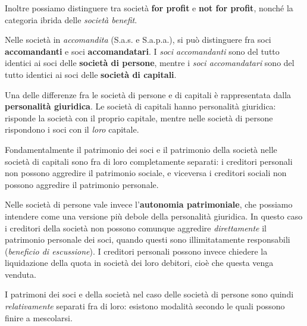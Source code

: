 \documentclass[a4paper,11pt]{article}
\begin{document}
Inoltre possiamo distinguere tra società \textbf{for profit} e \textbf{not for profit}, nonché la categoria ibrida delle \textit{società benefit}.

Nelle società in \textit{accomandita} (S.a.s. e S.a.p.a.), si può distinguere fra soci \textbf{accomandanti} e soci \textbf{accomandatari}.
I \textit{soci accomandanti} sono del tutto identici ai soci delle \textbf{società di persone}, mentre i \textit{soci accomandatari} sono del tutto identici ai soci delle \textbf{società di capitali}.

Una delle differenze fra le società di persone e di capitali è rappresentata dalla \textbf{personalità giuridica}.
Le società di capitali hanno personalità giuridica: risponde la società con il proprio capitale, mentre nelle società di persone rispondono i soci con il \textit{loro} capitale.

Fondamentalmente il patrimonio dei soci e il patrimonio della società nelle società di capitali sono fra di loro completamente separati: i creditori personali non possono aggredire il patrimonio sociale, e viceversa i creditori sociali non possono aggredire il patrimonio personale.

Nelle società di persone vale invece l'\textbf{autonomia patrimoniale}, che possiamo intendere come una versione più debole della personalità giuridica.
In questo caso i creditori della società non possono comunque aggredire \textit{direttamente} il patrimonio personale dei soci, quando questi sono illimitatamente responsabili (\textit{beneficio di escussione}).
I creditori personali possono invece chiedere la liquidazione della quota in società dei loro debitori, cioè che questa venga venduta.

I patrimoni dei soci e della società nel caso delle società di persone sono quindi \textit{relativamente} separati fra di loro: esistono modalità secondo le quali possono finire a mescolarsi.
\end{document}
